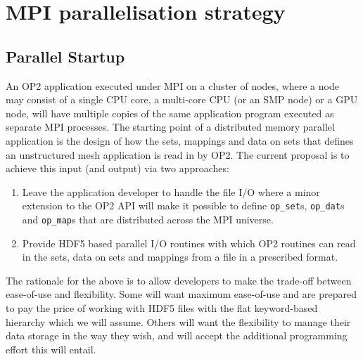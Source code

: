 \documentclass[11pt]{article}
\begin{document}
\section{MPI parallelisation strategy}
\subsection{Parallel Startup}\label{subsec/startup}
An OP2 application executed under MPI on a cluster of nodes, where a node may consist of a single CPU core, a
multi-core CPU (or an SMP node) or a GPU node, will have multiple copies of the same application program executed as
separate MPI processes. The starting point of a distributed memory parallel application is the design of how the sets,
mappings and data on sets that defines an unstructured mesh application is read in by OP2. The current proposal is to
achieve this input (and output) via two approaches:
\begin{enumerate}
\item Leave the application developer to handle the file I/O where a minor extension to the OP2 API will make it
possible to define \texttt{op\_set}s, \texttt{op\_dat}s and \texttt{op\_map}s that are distributed across the MPI
universe.
\item Provide HDF5 based parallel I/O routines with which OP2 routines can read in the sets, data on sets and mappings
from a file in a prescribed format.
\end{enumerate}
The rationale for the above is to allow developers to make the trade-off between ease-of-use and flexibility. Some will
want maximum ease-of-use and are prepared to pay the price of working with HDF5 files with the flat keyword-based
hierarchy which we will assume. Others will want the flexibility to manage their data storage in the way they wish, and
will accept the additional programming effort this will entail.
\end{document}
